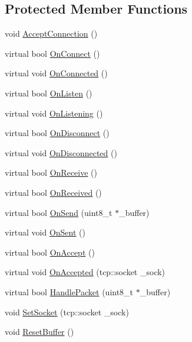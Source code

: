 \subsection*{Protected Member Functions}
\begin{DoxyCompactItemize}
\item 
void \hyperlink{classCore_1_1CNetwork__Asio_a048ed61b243deed5905b89b0826f413b}{Accept\+Connection} ()
\item 
virtual bool \hyperlink{classCore_1_1CNetwork__Asio_a8b5610d420eaa22aafa429fe9d7590a9}{On\+Connect} ()
\item 
virtual void \hyperlink{classCore_1_1CNetwork__Asio_a654726debc63f13a31e8f3c0d517259e}{On\+Connected} ()
\item 
virtual bool \hyperlink{classCore_1_1CNetwork__Asio_a09c413ff854b8d8aa53b09f3eb610a34}{On\+Listen} ()
\item 
virtual void \hyperlink{classCore_1_1CNetwork__Asio_a1534e01f0aae39a12af3ac3e88aa7954}{On\+Listening} ()
\item 
virtual bool \hyperlink{classCore_1_1CNetwork__Asio_afb65283ace223c5a3bea6029b8c6a809}{On\+Disconnect} ()
\item 
virtual void \hyperlink{classCore_1_1CNetwork__Asio_a1e813736a887fe3a128b1672be1cbb10}{On\+Disconnected} ()
\item 
virtual bool \hyperlink{classCore_1_1CNetwork__Asio_af97c853ab0bcba0372919f0a243f4cb5}{On\+Receive} ()
\item 
virtual bool \hyperlink{classCore_1_1CNetwork__Asio_acb2952682b6abbce60b01d9c75b02729}{On\+Received} ()
\item 
virtual bool \hyperlink{classCore_1_1CNetwork__Asio_a3cfea157222e7ef2c1e67f2c0e25ed8c}{On\+Send} (uint8\+\_\+t $\ast$\+\_\+buffer)
\item 
virtual void \hyperlink{classCore_1_1CNetwork__Asio_a79ff0fbfb787e26a079ef259160de6e3}{On\+Sent} ()
\item 
virtual bool \hyperlink{classCore_1_1CNetwork__Asio_aa66213bfe03d098460347866bcf8a5fb}{On\+Accept} ()
\item 
virtual void \hyperlink{classCore_1_1CNetwork__Asio_a520443f28e0df2f1f38cfc685414aa98}{On\+Accepted} (tcp\+::socket \+\_\+sock)
\item 
virtual bool \hyperlink{classCore_1_1CNetwork__Asio_a8f1418b5bae79829a617fe8d0ae1a44d}{Handle\+Packet} (uint8\+\_\+t $\ast$\+\_\+buffer)
\item 
void \hyperlink{classCore_1_1CNetwork__Asio_a9d50c31ca63f017cfbdcbd97a4c8be0e}{Set\+Socket} (tcp\+::socket \+\_\+sock)
\item 
void \hyperlink{classCore_1_1CNetwork__Asio_a8781a7dee1202b6b984d25afd0002b0a}{Reset\+Buffer} ()
\end{DoxyCompactItemize}
